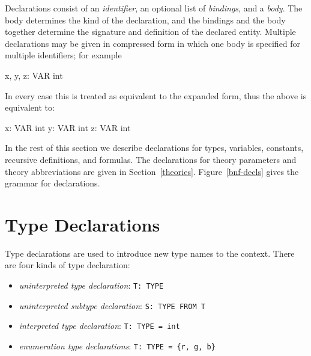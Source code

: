 
Declarations consist of an
\emph{identifier}, an optional list of
\emph{bindings}, and a
\emph{body}.  The body determines the kind of the
declaration, and the bindings and the body together determine the
signature and definition of the declared entity.  Multiple
declarations may be given in compressed form
in which one body is specified for multiple identifiers; for example
%
\begin{pvsex}
  x, y, z: VAR int
\end{pvsex}
In every case this is treated as equivalent to the expanded form, thus
the above is equivalent to:
\begin{pvsex}
  x: VAR int
  y: VAR int
  z: VAR int
\end{pvsex}

In the rest of this section we describe declarations for types,
variables, constants, recursive definitions, and formulas.  The
declarations for theory parameters and theory abbreviations are given in
Section~\ref{theories}.  Figure~\ref{bnf-decls} gives the grammar for
declarations.


\section{Type Declarations}\label{type-declarations}

Type declarations are used to introduce new type names to the context.
There are four kinds of type declaration:

\begin{itemize}

\item \emph{uninterpreted type declaration}: \texttt{T:\ TYPE}

\item \emph{uninterpreted subtype declaration}: \texttt{S:\ TYPE FROM T}

\item \emph{interpreted type declaration}: \texttt{T:\ TYPE =
int}

\item \emph{enumeration type declarations}: \texttt{T:\ TYPE = \{r,
g, b\}} 

\end{itemize}

